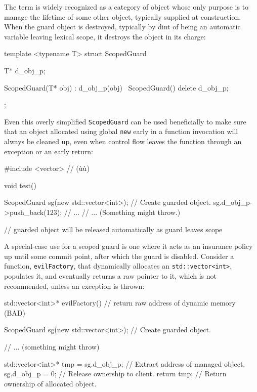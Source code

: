 The term  is widely recognized as a category of
object whose only purpose is to manage the lifetime of some other
object, typically supplied at construction. When the guard object is
destroyed, typically by dint of being an automatic variable leaving
lexical scope, it destroys the object in its charge:

\begin{emcppslisting}
template <typename T>
struct ScopedGuard
{
   T* d_obj_p;

   ScopedGuard(T* obj) : d_obj_p(obj) { }
   ~ScopedGuard() { delete d_obj_p; }
};
\end{emcppslisting}
    

\noindent Even this overly simplified \lstinline!ScopedGuard! can be used
beneficially to make sure that an object allocated using global
\lstinline!new! early in a function invocation will always be cleaned up,
even when control flow leaves the function through an exception or an
early return:

\begin{emcppslisting}
#include <vector>  // (ù{}ù)

void test()
{
    ScopedGuard sg(new std::vector<int>);  // Create guarded object.
    sg.d_obj_p->push_back(123);
    // ...
    // ...              (Something might throw.)

}  // guarded object will be released automatically as guard leaves scope
\end{emcppslisting}
    

\noindent A special-case use for a scoped guard is one where it acts as an
insurance policy up until some commit point, after which the guard is
disabled. Consider a function, \lstinline!evilFactory!, that dynamically
allocates an \lstinline!std::vector<int>!, populates it, and eventually
returns a raw pointer to it, which is not recommended, unless an
exception is thrown:

\begin{emcppslisting}
std::vector<int>* evilFactory()  // return raw address of dynamic memory (BAD)
{
    ScopedGuard sg(new std::vector<int>);  // Create guarded object.

    // ...              (something might throw)

    std::vector<int>* tmp = sg.d_obj_p;  // Extract address of managed object.
    sg.d_obj_p = 0;                      // Release ownership to client.
    return tmp;                          // Return ownership of allocated object.
}
\end{emcppslisting}
    

